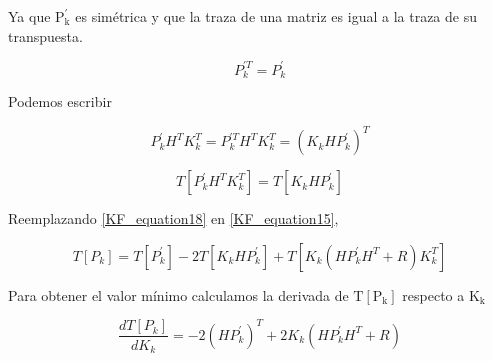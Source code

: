 \documentclass[10pt,a4paper]{article}
\begin{document}
    \noindent Ya que $\mathrm{P^\prime_k}$ es simétrica y que la traza de una 
    matriz es igual a la traza de su transpuesta.
	
	\begin{figure}[h!]
		\begin{center}
			\begin{equation}
				P^{\prime T}_k  = P^\prime_k
				\label{KF_equation16}
			\end{equation}	
		\end{center}
	\end{figure}
	
	\noindent Podemos escribir
	
	\begin{figure}[h!]
		\begin{center}
			\begin{equation}
				P^\prime_k H^T K^T_k = P^{\prime T}_k H^T K^T_k = (K_k H P^\prime_k )^T
				\label{KF_equation17}
			\end{equation}	
		\end{center}
	\end{figure}
	
	\begin{figure}[h!]
		\begin{center}
			\begin{equation}
				T[P^\prime_k H^T K^T_k] = T[K_k H P^\prime_k]
				\label{KF_equation18}
			\end{equation}	
		\end{center}
	\end{figure}
	
	\noindent Reemplazando \ref{KF_equation18} en \ref{KF_equation15},

	\begin{figure}[h!]
		\begin{center}
			\begin{equation}
				T[P_k] = T[P^\prime_k] -2 T[K_k H P^\prime_k] + T[K_k (H P^\prime_k H^T + R) K^T_k]
				\label{KF_equation19}
			\end{equation}	
		\end{center}
	\end{figure}
	
	\noindent Para obtener el valor mínimo calculamos la derivada de 
    $\mathrm{T[P_k]}$ respecto a $\mathrm{K_k}$
	
	\begin{figure}[h!]
		\begin{center}
			\begin{equation}
				\frac{dT[P_k]}{dK_k} = -2 (H P^\prime_k)^T + 2K_k (H P^\prime_k H^T + R)
				\label{KF_equation20}
			\end{equation}	
		\end{center}
	\end{figure}
	
\end{document}
